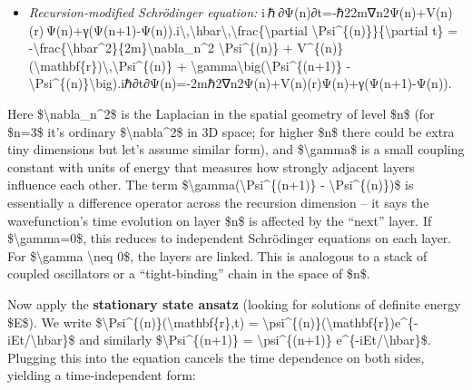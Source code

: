 \documentclass[
]{article}
\begin{document}
{\begin{itemize}
\item
  \emph{Recursion-modified Schrödinger equation:}
  i ℏ ∂Ψ(n)∂t=-ℏ22m∇n2Ψ(n)+V(n)(r) Ψ(n)+γ(Ψ(n+1)-Ψ(n)).i\textbackslash,\textbackslash hbar\textbackslash,\textbackslash frac\{\textbackslash partial
  \textbackslash Psi\^{}\{(n)\}\}\{\textbackslash partial t\} =
  -\textbackslash frac\{\textbackslash hbar\^{}2\}\{2m\}\textbackslash nabla\_n\^{}2
  \textbackslash Psi\^{}\{(n)\} +
  V\^{}\{(n)\}(\textbackslash mathbf\{r\})\textbackslash,\textbackslash Psi\^{}\{(n)\}
  +
  \textbackslash gamma\textbackslash big(\textbackslash Psi\^{}\{(n+1)\}
  -
  \textbackslash Psi\^{}\{(n)\}\textbackslash big).iℏ∂t∂Ψ(n)\hspace{0pt}=-2mℏ2\hspace{0pt}∇n2\hspace{0pt}Ψ(n)+V(n)(r)Ψ(n)+γ(Ψ(n+1)-Ψ(n)).
\end{itemize}

Here \$\textbackslash nabla\_n\^{}2\$ is the Laplacian in the spatial
geometry of level \$n\$ (for \$n=3\$ it's ordinary
\$\textbackslash nabla\^{}2\$ in 3D space; for higher \$n\$ there could
be extra tiny dimensions but let's assume similar form), and
\$\textbackslash gamma\$ is a small coupling constant with units of
energy that measures how strongly adjacent layers influence each
other\hspace{0pt}. The term
\$\textbackslash gamma(\textbackslash Psi\^{}\{(n+1)\} -
\textbackslash Psi\^{}\{(n)\})\$ is essentially a difference operator
across the recursion dimension -- it says the wavefunction's time
evolution on layer \$n\$ is affected by the ``next'' layer. If
\$\textbackslash gamma=0\$, this reduces to independent Schrödinger
equations on each layer. For \$\textbackslash gamma \textbackslash neq
0\$, the layers are linked. This is analogous to a stack of coupled
oscillators or a ``tight-binding'' chain in the space of
\$n\$\hspace{0pt}.

Now apply the \textbf{stationary state ansatz} (looking for solutions of
definite energy \$E\$). We write
\$\textbackslash Psi\^{}\{(n)\}(\textbackslash mathbf\{r\},t) =
\textbackslash psi\^{}\{(n)\}(\textbackslash mathbf\{r\})e\^{}\{-iEt/\textbackslash hbar\}\$
and similarly \$\textbackslash Psi\^{}\{(n+1)\} =
\textbackslash psi\^{}\{(n+1)\}
e\^{}\{-iEt/\textbackslash hbar\}\$\hspace{0pt}. Plugging this into the
equation cancels the time dependence on both sides, yielding a
time-independent form:

}
\end{document}

